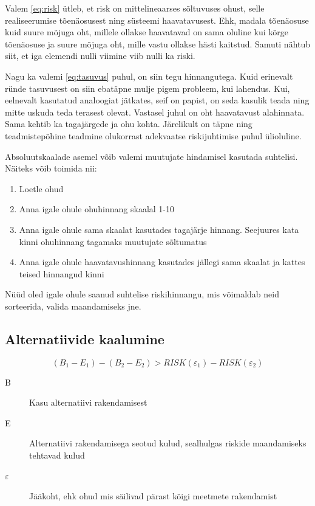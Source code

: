 \documentclass{tufte-book}
\begin{document}
Valem \ref{eq:risk} ütleb, et risk on mittelineaarses sõltuvuses ohust, selle realiseerumise tõenäosusest ning süsteemi haavatavusest. Ehk, madala tõenäosuse kuid suure mõjuga oht, millele ollakse haavatavad on sama oluline kui kõrge tõenäosuse ja suure mõjuga oht, mille vastu ollakse hästi kaitstud. Samuti nähtub siit, et iga elemendi nulli viimine viib nulli ka riski. 

Nagu ka valemi \ref{eq:tasuvus} puhul, on siin tegu hinnangutega. Kuid erinevalt ründe tasuvusest on siin ebatäpne mulje pigem probleem, kui lahendus. Kui, eelnevalt kasutatud analoogiat jätkates, seif on papist, on seda kasulik teada ning mitte uskuda teda terasest olevat. Vastasel juhul on oht haavatavust alahinnata. Sama kehtib ka tagajärgede ja ohu kohta. Järelikult on täpne ning teadmistepõhine teadmine olukorrast adekvaatse riskijuhtimise puhul ülioluline.

Absoluutskaalade asemel võib valemi muutujate hindamisel kasutada suhtelisi. Näiteks võib toimida nii:

\begin{enumerate}
	\item Loetle ohud
	\item Anna igale ohule ohuhinnang skaalal 1-10
	\item Anna igale ohule sama skaalat kasutades tagajärje hinnang. Seejuures kata kinni ohuhinnang tagamaks muutujate sõltumatus
	\item Anna igale ohule haavatavushinnang kasutades jällegi sama skaalat ja kattes teised hinnangud kinni
\end{enumerate}

Nüüd oled igale ohule saanud suhtelise riskihinnangu, mis võimaldab neid sorteerida, valida maandamiseks jne.  

\subsection{Alternatiivide kaalumine}
\begin{equation}
	(B_1 - E_1) - (B_2 - E_2) > RISK(\varepsilon_1)-RISK(\varepsilon_2)
	\label{eq:alternative}
\end{equation}

\begin{description}
	\item[B] Kasu alternatiivi rakendamisest
	\item[E] Alternatiivi rakendamisega seotud kulud, sealhulgas riskide maandamiseks tehtavad kulud 
	\item[$\varepsilon$] Jääkoht, ehk ohud mis säilivad pärast kõigi meetmete rakendamist
\end{description}
\end{document}

